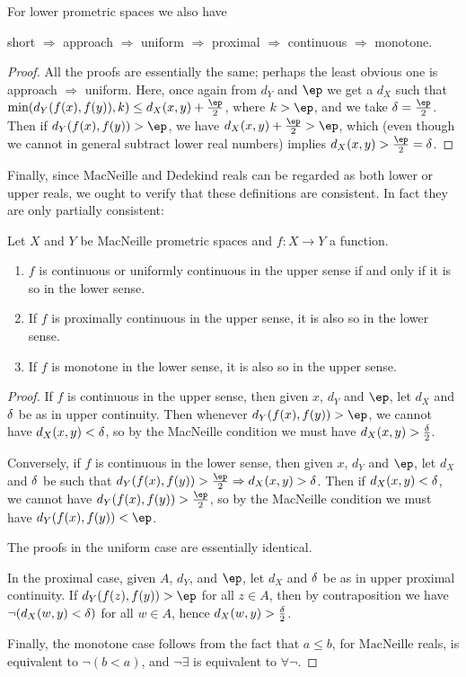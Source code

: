 \documentclass{article}
\let\implies\Rightarrow
\def\hfep{\frac{\ep}{2}}
\begin{document}
\begin{thm}
  For lower prometric spaces we also have
  \begin{center}
    short $\implies$ approach $\implies$ uniform $\implies$ proximal $\implies$ continuous $\implies$ monotone.
  \end{center}
\end{thm}
\begin{proof}
  All the proofs are essentially the same; perhaps the least obvious one is approach $\implies$ uniform.
  Here, once again from $d_Y$ and $\ep$ we get a $d_X$ such that $\min(d_Y(f(x),f(y)),k) \le d_X(x,y) +\hfep$, where $k>\ep$, and we take $\de=\hfep$.
  Then if $d_Y(f(x),f(y))>\ep$, we have $d_X(x,y)+\hfep >\ep$, which (even though we cannot in general subtract lower real numbers) implies $d_X(x,y)>\hfep = \de$.
\end{proof}

Finally, since MacNeille and Dedekind reals can be regarded as both lower or upper reals, we ought to verify that these definitions are consistent.
In fact they are only partially consistent:

\begin{thm}\label{thm:anti-continuous}
  Let $X$ and $Y$ be MacNeille prometric spaces and $f:X\to Y$ a function.
  \begin{enumerate}
  \item $f$ is continuous or uniformly continuous in the upper sense if and only if it is so in the lower sense.
  \item If $f$ is proximally continuous in the upper sense, it is also so in the lower sense.
  \item If $f$ is monotone in the lower sense, it is also so in the upper sense.
  \end{enumerate}
\end{thm}
\begin{proof}
  If $f$ is continuous in the upper sense, then given $x$, $d_Y$ and $\ep$, let $d_X$ and $\delta$ be as in upper continuity.
  Then whenever $d_Y(f(x),f(y)) > \ep$, we cannot have $d_X(x,y) < \delta$, so by the MacNeille condition we must have $d_X(x,y) > \frac{\delta}{2}$.

  Conversely, if $f$ is continuous in the lower sense, then given $x$, $d_Y$ and $\ep$, let $d_X$ and $\delta$ be such that $d_Y(f(x),f(y))>\hfep \implies d_X(x,y)>\de$.
  Then if $d_X(x,y)<\delta$, we cannot have $d_Y(f(x),f(y))>\hfep$, so by the MacNeille condition we must have $d_Y(f(x),f(y))<\ep$.

  The proofs in the uniform case are essentially identical.

  In the proximal case, given $A$, $d_Y$, and $\ep$, let $d_X$ and $\delta$ be as in upper proximal continuity.
  If $d_Y(f(z),f(y))>\ep$ for all $z\in A$, then by contraposition we have $\neg (d_X(w,y)<\delta)$ for all $w\in A$, hence $d_X(w,y)>\frac{\delta}{2}$.

  Finally, the monotone case follows from the fact that $a\le b$, for MacNeille reals, is equivalent to $\neg(b<a)$, and $\neg\exists$ is equivalent to $\forall\neg$.
\end{proof}
\end{document}

